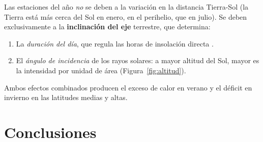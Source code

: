 Las estaciones del año \emph{no} se deben a la variación en la distancia Tierra-Sol
(la Tierra está más cerca del Sol en enero, en el perihelio, que en julio).
Se deben exclusivamente a la \textbf{inclinación del eje} terrestre, que determina:

\begin{enumerate}
  \item La \textit{duración del día}, que regula las horas de insolación directa
        \citep{CarrollOstlie2017}.
  \item El \textit{ángulo de incidencia} de los rayos solares: a mayor altitud del Sol,
        mayor es la intensidad por unidad de área (Figura~\ref{fig:altitud}).
\end{enumerate}

Ambos efectos combinados producen el exceso de calor en verano y el déficit en invierno
en las latitudes medias y altas.

\section{Conclusiones}

